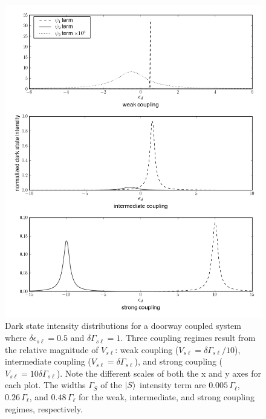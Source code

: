 \documentclass[12pt]{mitthesis}
\begin{document}
\begin{figure}
  \caption{Dark state intensity distributions for a doorway coupled
    system where $\delta \epsilon_{s\ell} = 0.5$ and $\delta
    \Gamma_{s\ell} = 1$. Three coupling regimes result from the
    relative magnitude of $V_{s\ell}$: weak coupling ($V_{s\ell} =
    \delta \Gamma_{s\ell} / 10$), intermediate coupling ($V_{s\ell} =
    \delta \Gamma_{s\ell}$), and strong coupling ($V_{s\ell} = 10
    \delta \Gamma_{s\ell}$). Note the different scales of both the x
    and y axes for each plot. The widths $\Gamma_S$ of the $\mathinner{|{S}\rangle}$
    intensity term are $0.005 \, \Gamma_{\ell}$, $0.26 \,
    \Gamma_{\ell}$, and $0.48 \, \Gamma_{\ell}$ for the weak,
    intermediate, and strong coupling regimes, respectively.}
  \label{fig:complex-overlaps}
  \centering
  \includegraphics[width=6.4in]{complex-overlaps.png}
\end{figure}
\end{document}

